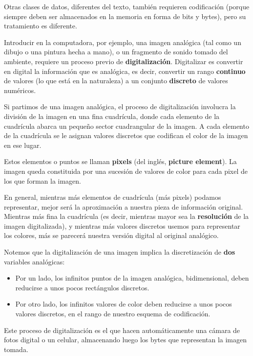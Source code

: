 \documentclass[spanish,A4,]{article}
\begin{document}
Otras clases de datos, diferentes del texto, también requieren
codificación (porque siempre deben ser almacenados en la memoria en
forma de bits y bytes), pero su tratamiento es diferente.

Introducir en la computadora, por ejemplo, una imagen analógica (tal
como un dibujo o una pintura hecha a mano), o un fragmento de sonido
tomado del ambiente, requiere un proceso previo de
\textbf{digitalización}. Digitalizar es convertir en digital la
información que es analógica, es decir, convertir un rango
\textbf{continuo} de valores (lo que está en la naturaleza) a un
conjunto \textbf{discreto} de valores numéricos.

Si partimos de una imagen analógica, el proceso de digitalización
involucra la división de la imagen en una fina cuadrícula, donde cada
elemento de la cuadrícula abarca un pequeño sector cuadrangular de la
imagen. A cada elemento de la cuadrícula se le asignan valores discretos
que codifican el color de la imagen en ese lugar.

Estos elementos o puntos se llaman \textbf{pixels} (del inglés,
\textbf{picture element}). La imagen queda constituida por una sucesión
de valores de color para cada pixel de los que forman la imagen.

En general, mientras más elementos de cuadrícula (más pixels) podamos
representar, mejor será la aproximación a nuestra pieza de información
original. Mientras más fina la cuadrícula (es decir, mientras mayor sea
la \textbf{resolución} de la imagen digitalizada), y mientras más
valores discretos usemos para representar los colores, más se parecerá
nuestra versión digital al original analógico.

Notemos que la digitalización de una imagen implica la discretización de
\textbf{dos} variables analógicas:

\begin{itemize}
\itemsep1pt\parskip0pt
\item
  Por un lado, los infinitos puntos de la imagen analógica,
  bidimensional, deben reducirse a unos pocos rectángulos discretos.
\item
  Por otro lado, los infinitos valores de color deben reducirse a unos
  pocos valores discretos, en el rango de nuestro esquema de
  codificación.
\end{itemize}

Este proceso de digitalización es el que hacen automáticamente una
cámara de fotos digital o un celular, almacenando luego los bytes que
representan la imagen tomada.
\end{document}
